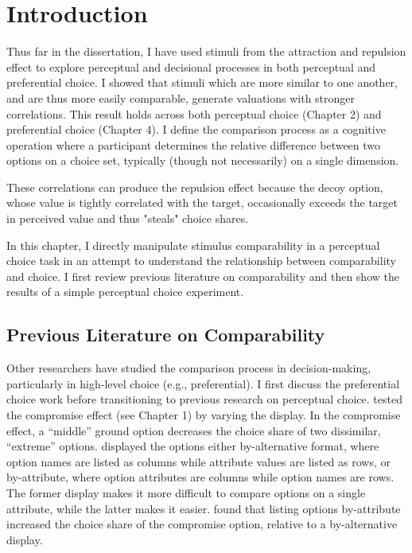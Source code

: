 \section{Introduction}

Thus far in the dissertation, I have used stimuli from the attraction and repulsion effect to explore perceptual and decisional processes in both perceptual and preferential choice. I showed that stimuli which are more similar to one another, and are thus more easily comparable, generate valuations with stronger correlations. This result holds across both perceptual choice (Chapter 2) and preferential choice (Chapter 4). I define the comparison process as a cognitive operation where a participant determines the relative difference between two options on a choice set, typically (though not necessarily) on a single dimension. 

These correlations can produce the repulsion effect \parencite{spektorWhenGoodLooks2018b,simonson2014vices} because the decoy option, whose value is tightly correlated with the target, occasionally exceeds the target in perceived value and thus "steals" choice shares. 

In this chapter, I directly manipulate stimulus comparability in a perceptual choice task in an attempt to understand the relationship between comparability and choice. I first review previous literature on comparability and then show the results of a simple perceptual choice experiment.

\subsection{Previous Literature on Comparability}

Other researchers have studied the comparison process in decision-making, particularly in high-level choice (e.g., preferential). I first discuss the preferential choice work before transitioning to previous research on perceptual choice. \textcite{changWhichCompromiseOption2008} tested the compromise effect (see Chapter 1) by varying the display. In the compromise effect, a “middle” ground option decreases the choice share of two dissimilar, “extreme” options. \textcite{changWhichCompromiseOption2008} displayed the options either by-alternative format, where option names are listed as columns while attribute values are listed as rows, or by-attribute, where option attributes are columns while option names are rows. The former display makes it more difficult to compare options on a single attribute, while the latter makes it easier. \textcite{changWhichCompromiseOption2008} found that listing options by-attribute increased the choice share of the compromise option, relative to a by-alternative display. 


